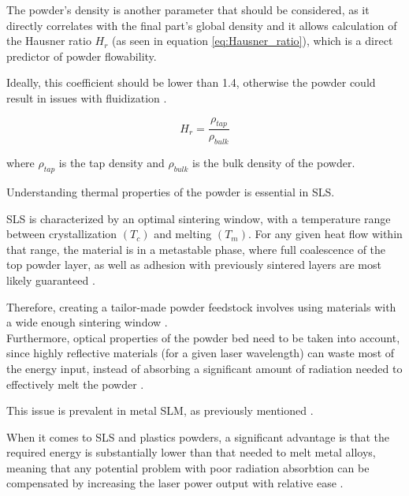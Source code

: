 \documentclass[a4paper]{article}
\begin{document}
    The powder's density is another parameter that should be considered, as it directly correlates with the final part's 
    global density and it allows calculation of the Hausner ratio $H_r$ (as seen in equation \ref{eq:Hausner_ratio}), which is a direct predictor of powder flowability. 
    
    Ideally, this coefficient should be lower than 1.4, otherwise the powder could result in issues with fluidization \autocite*{doi:10.1063/1.4918516}. 

    \begin{equation}
        H_r = \frac{\rho_{tap}}{\rho_{bulk}}
        \label{eq:Hausner_ratio}
    \end{equation} 

    where $\rho_{tap}$ is the tap density and $\rho_{bulk}$ is the bulk density of the powder. 

    \clearpage



    Understanding thermal properties of the powder is essential in SLS. 


    SLS is characterized by an optimal sintering window, with a temperature range between
    crystallization $(T_c)$ and melting $(T_m)$. 
    For any given heat flow within that range, the material is in a metastable phase, 
    where full coalescence of the top powder layer, as well as adhesion with previously sintered layers are 
    most likely guaranteed \autocite{doi:10.1063/1.4918516}. 

    Therefore, creating a tailor-made powder feedstock involves using materials with a wide enough 
    sintering window \autocites*{DechetMaximilianA2020OtDo}{doi:10.1063/1.4918516}. \\

    Furthermore, optical properties of the powder bed need to be taken into account, since highly reflective materials (for a given 
    laser wavelength) can waste most of the energy input, instead of absorbing a significant amount of radiation needed to 
    effectively melt the powder \autocite{doi:10.1063/1.4918516}.  

    This issue is prevalent in metal SLM, as previously mentioned \autocites{doi:10.1063/1.4918516, Latvian_additive}. 
    
    When it comes to SLS and plastics powders, a significant advantage is that the required energy is substantially lower than that needed to melt metal alloys, 
    meaning that any potential problem with poor radiation absorbtion can be compensated by increasing the 
    laser power output with relative ease \autocite{doi:10.1063/1.4918516}. \\ 
    
\end{document}
